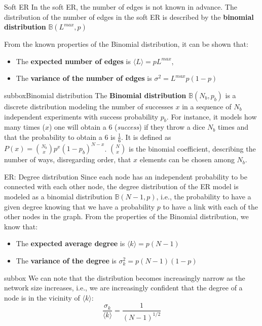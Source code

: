 \documentclass[a4paper,11pt]{book}
\begin{document}
\begin{textbox}{Soft ER}
In the soft ER, the number of edges is not known in advance. The distribution of the number of edges in the soft ER is described by the \textbf{binomial distribution} $\mathbb{B}(L^{max},p)$



From the known properties of the Binomial distribution, it can be shown that:
\begin{itemize}
    \item The \textbf{expected number of edges} is $\langle L \rangle = p L^{max}$, 

    \item The \textbf{variance of the number of edges} is $\sigma^2 = L^{max}p(1-p)$
\end{itemize}

\end{textbox}



\begin{subbox}{subbox}{Binomial distribution}
 The \textbf{Binomial distribution} $\mathbb{B}(N_b,p_b)$ is a discrete distribution modeling the number of successes $x$ in a sequence of $N_b$ independent experiments with success probability $p_b$. For instance, it models how many times ($x$) one will obtain a 6 (\textit{success}) if they throw a dice $N_b$ times and that the probability to obtain a 6 is $\frac{1}{6}$. It is defined as $P(x)=\binom{N_b}{x}p^x(1-p_b)^{N-x}$. $\binom{N}{x}$ is the binomial coefficient, describing the number of ways, disregarding order, that $x$ elements can be chosen among $N_b$.
\end{subbox}





\begin{textbox}{ER: Degree distribution}
Since each node has an independent probability to be connected with each other node, the degree distribution of the ER model is modeled as a binomial distribution $\mathbb{B} (N-1 , p)$, i.e., the probability to have a given degree knowing that we have a probability $p$ to have a link with each of the other nodes in the graph. From the properties of the Binomial distribution, we know that:
\begin{itemize}
    \item The \textbf{expected average degree} is $\langle k \rangle=p(N-1)$
    \item The \textbf{variance of the degree} is $\sigma^2_k =p(N-1)(1-p)$
\end{itemize}

\begin{subbox}{subbox}{}
We can note that the distribution becomes increasingly narrow as the network size increases, i.e., we are increasingly confident that the degree of a node is in the vicinity of $\langle k \rangle$: 
\[
\frac{\sigma_k}{\langle k \rangle}=\frac{1}{(N-1)^{1/2}}
\]
\end{subbox}

\end{textbox}
\end{document}
